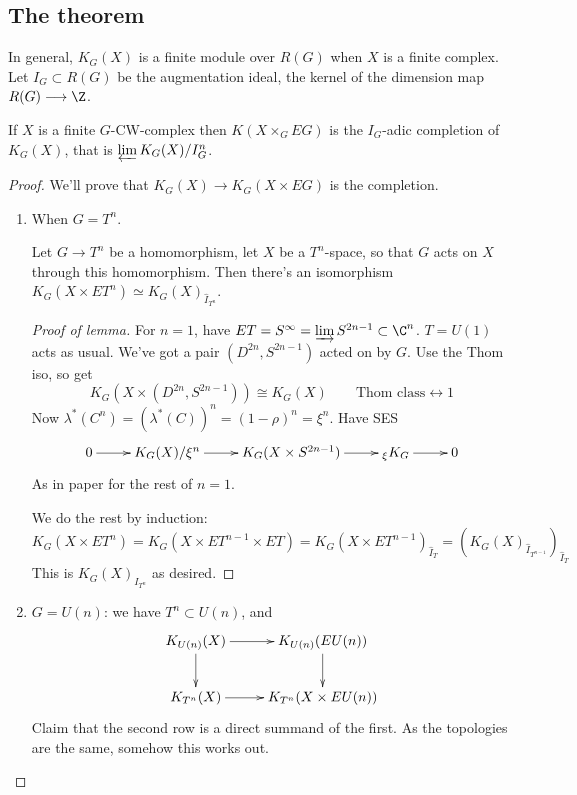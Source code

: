 \documentclass[11pt]{article}
\begin{document}
\begin{GuozhenEqKthyPractice}
\subsection*{The theorem}
In general, $K_G(X)$ is a finite module over $R(G)$ when $X$ is a finite complex.  Let $I_G\subset R(G)$ be the augmentation ideal, the kernel of the dimension map $R(G)\to\Z$.
\begin{thm*}
If $X$ is a finite $G$-CW-complex  then $K(X\times_G EG)$ is the $I_G$-adic completion of $K_G(X)$, that is $\varprojlim K_G(X)/I_G^n$.
\end{thm*}
\begin{proof}
We'll prove that $K_G(X)\to K_G(X\times EG)$ is the completion.
\begin{enumerate}
\item When $G=T^n$.
\begin{lem*}
Let $G\to T^n$ be a homomorphism, let $X$ be a $T^n$-space, so that $G$ acts on $X$ through this homomorphism. Then there's an isomorphism $K_G(X\times ET^n)\simeq K_G(X)_{\hat I_{T^n}}$.
\end{lem*}
\begin{proof}[Proof of lemma]
For $n=1$, have $ET=S^\infty=\varinjlim S^{2n-1}\subset \C^n$. $T=U(1)$ acts as usual. We've got a pair $(D^{2n},S^{2n-1})$ acted on by $G$. Use the Thom iso, so get
\[K_G(X\times(D^{2n},S^{2n-1}))\cong K_G(X)\qquad    \text{Thom class}\longleftrightarrow 1\]
Now $\lambda^*(C^n)=(\lambda^*(C))^n=(1-\rho)^n=\xi^n$. Have SES
\[\xymatrix{
0\ar[r] &K_G(X)/\xi^n\ar[r] &K_G(X\times S^{2n-1})\ar[r]& {_{\xi}K_G}\ar[r]&0
}\]
As in paper for the rest of $n=1$.

We do the rest by induction:
\[K_G(X\times ET^n)=K_G(X\times ET^{n-1}\times ET)=K_G(X\times ET^{n-1})_{\hat I_T}=(K_G(X)_{\hat I_{T^{n-1}}})_{\hat I_{T}}\]
This is $K_G(X)_{I_{T^n}}$ as desired.
\end{proof}
\item $G=U(n)$: we have $T^n\subset U(n)$, and 
\[\xymatrix{
K_{U(n)}(X)\ar[r]\ar[d]& K_{U(n)}(EU(n))\ar[d]\\
\ar[r]K_{T^n}(X)&K_{T^n}(X\times EU(n))
}\]
Claim that the second row is a direct summand of the first. As the topologies are the same, somehow this works out.


\end{enumerate}
\end{proof}
\end{GuozhenEqKthyPractice}
\end{document}
